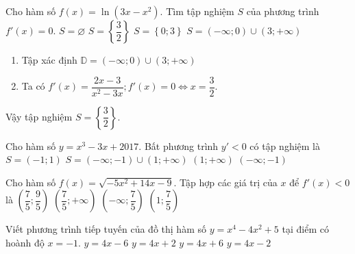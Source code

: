\begin{ex}%
	Cho hàm số $f(x)=\ln \left (3x-x^2\right )$. Tìm tập nghiệm $S$ của phương trình $f'(x) =0$.		
	\choice
	{$S= \varnothing$}
	{\True $S =\left\{ \dfrac{3}{2}\right \}$}
	{$S =\left\{0;3\right \}$}
	{$S =\left( -\infty;0\right ) \cup \left (3;+\infty\right )$}
	\loigiai
	{
		\begin{enumerate}
			\item Tập xác định $\mathbb{D} =(-\infty;0)\cup (3;+\infty)$
			\item Ta có $f'(x) =\dfrac{2x-3}{x^2 -3x}; f'(x) =0\Leftrightarrow x=\dfrac{3}{2}$.
		\end{enumerate}
		Vậy tập nghiệm $S =\left\{ \dfrac{3}{2}\right \}$.
	}
\end{ex}

\begin{ex}%
	Cho hàm số $y=x^3-3x+2017$. Bất phương trình $y' < 0$ có tập nghiệm là
	\choice
	{\True $S=\left(-1;1\right)$}
	{$S=\left(-\infty;-1\right)\cup \left(1;+\infty \right)$}
	{$\left(1;+\infty \right)$}
	{$\left(-\infty;-1\right)$}
\end{ex}

\begin{ex}
	Cho hàm số $ f(x)=\sqrt{-5x^2+14x-9} $. Tập hợp các giá trị của $ x $ để $ f'(x)<0 $ là
	\choice
	{\True $ \left(\dfrac{7}{5};\dfrac{9}{5}\right) $}
	{$ \left(\dfrac{7}{5};+\infty\right) $}
	{$ \left(-\infty;\dfrac{7}{5}\right) $}
	{$ \left(1;\dfrac{7}{5}\right) $}
\end{ex}

\begin{ex}%
	Viết phương trình tiếp tuyến của đồ thị hàm số $y=x^4-4x^2+5$ tại điểm có hoành độ $x=-1$. 
	\choice
	{$y=4x-6$}
	{$y=4x+2$}
	{\True $y=4x+6$}
	{$y=4x-2$}
\end{ex}

